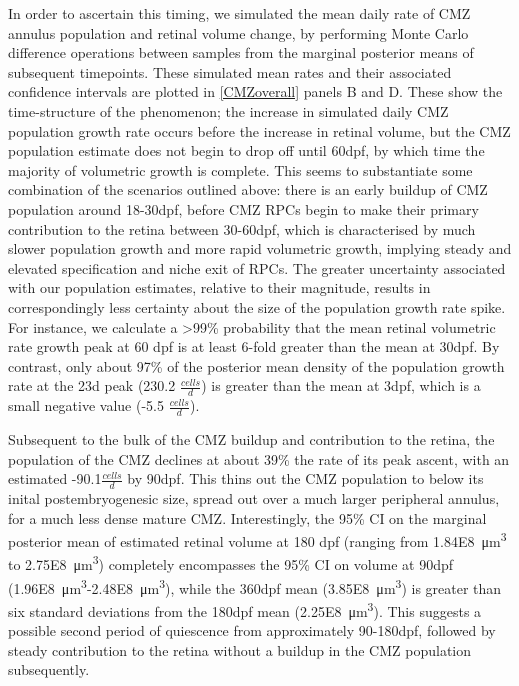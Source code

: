 In order to ascertain this timing, we simulated the mean daily rate of CMZ annulus population and retinal volume change, by performing Monte Carlo difference operations between samples from the marginal posterior means of subsequent timepoints. These simulated mean rates and their associated confidence intervals are plotted in \autoref{CMZoverall} panels B and D. These show the time-structure of the phenomenon; the increase in simulated daily CMZ population growth rate occurs before the increase in retinal volume, but the CMZ population estimate does not begin to drop off until 60dpf, by which time the majority of volumetric growth is complete. This seems to substantiate some combination of the scenarios outlined above: there is an early buildup of CMZ population around 18-30dpf, before CMZ RPCs begin to make their primary contribution to the retina between 30-60dpf, which is characterised by much slower population growth and more rapid volumetric growth, implying steady and elevated specification and niche exit of RPCs. The greater uncertainty associated with our population estimates, relative to their magnitude, results in correspondingly less certainty about the size of the population growth rate spike. For instance, we calculate a >99\% probability that the mean retinal volumetric rate growth peak at 60 dpf is at least 6-fold greater than the mean at 30dpf. By contrast, only about 97\% of the posterior mean density of the population growth rate at the 23d peak (230.2 $\frac{cells}{d}$) is greater than the mean at 3dpf, which is a small negative value (-5.5 $\frac{cells}{d}$). 

Subsequent to the bulk of the CMZ buildup and contribution to the retina, the population of the CMZ declines at about 39\% the rate of its peak ascent, with an estimated -90.1$\frac{cells}{d}$ by 90dpf. This thins out the CMZ population to below its inital postembryogenesic size, spread out over a much larger peripheral annulus, for a much less dense mature CMZ. Interestingly, the 95\% CI on the marginal posterior mean of estimated retinal volume at 180 dpf (ranging from \SI{1.84E8}{\cubic\micro\metre} to \SI{2.75E8}{\cubic\micro\metre}) completely encompasses the 95\% CI on volume at 90dpf (\SI{1.96E8}{\cubic\micro\metre}-\SI{2.48E8}{\cubic\micro\metre}), while the 360dpf mean (\SI{3.85E8}{\cubic\micro\metre}) is greater than six standard deviations from the 180dpf mean (\SI{2.25E8}{\cubic\micro\metre}). This suggests a possible second period of quiescence from approximately 90-180dpf, followed by steady contribution to the retina without a buildup in the CMZ population subsequently.

